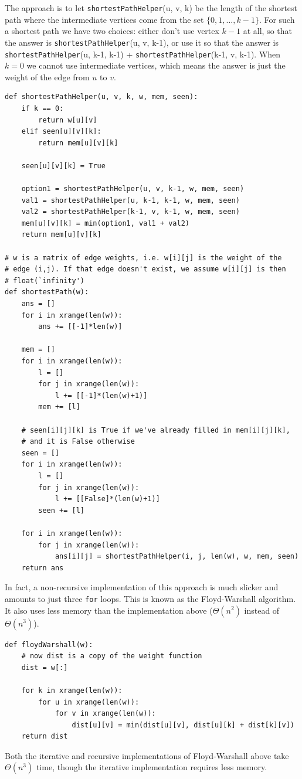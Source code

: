 \documentclass[11pt]{article}
\begin{document}
The
approach is to let \texttt{shortestPathHelper}(u, v, k) be the length of the
shortest path where the intermediate vertices come from the set
$\{0,1,\ldots,k-1\}$.  For such a shortest path we have two choices:
either don't use vertex $k-1$ at all, so that the answer is
\texttt{shortestPathHelper}(u, v, k-1), or use it so that the answer is
\texttt{shortestPathHelper}(u, k-1, k-1) + \texttt{shortestPathHelper}(k-1, v,
k-1).  When $k=0$ we cannot use intermediate vertices, which means the
answer is just the weight of the edge from $u$ to $v$.

\begin{verbatim}
def shortestPathHelper(u, v, k, w, mem, seen):
    if k == 0:
        return w[u][v]
    elif seen[u][v][k]:
        return mem[u][v][k]

    seen[u][v][k] = True
 
    option1 = shortestPathHelper(u, v, k-1, w, mem, seen)
    val1 = shortestPathHelper(u, k-1, k-1, w, mem, seen)
    val2 = shortestPathHelper(k-1, v, k-1, w, mem, seen)
    mem[u][v][k] = min(option1, val1 + val2)
    return mem[u][v][k]

# w is a matrix of edge weights, i.e. w[i][j] is the weight of the
# edge (i,j). If that edge doesn't exist, we assume w[i][j] is then
# float(`infinity')
def shortestPath(w):
    ans = []
    for i in xrange(len(w)):
        ans += [[-1]*len(w)]

    mem = []
    for i in xrange(len(w)):
        l = []
        for j in xrange(len(w)):
            l += [[-1]*(len(w)+1)]
        mem += [l]

    # seen[i][j][k] is True if we've already filled in mem[i][j][k],
    # and it is False otherwise
    seen = []
    for i in xrange(len(w)):
        l = []
        for j in xrange(len(w)):
            l += [[False]*(len(w)+1)]
        seen += [l]
    
    for i in xrange(len(w)):
        for j in xrange(len(w)):
            ans[i][j] = shortestPathHelper(i, j, len(w), w, mem, seen)
    return ans
\end{verbatim}

In fact, a non-recursive implementation of this approach is much
slicker and amounts to just three \texttt{for} loops.  This is known
as the Floyd-Warshall algorithm.  It also uses less memory than the
implementation above ($\Theta(n^2)$ instead of $\Theta(n^3)$).

\newpage

\begin{verbatim}
def floydWarshall(w):
    # now dist is a copy of the weight function
    dist = w[:]

    for k in xrange(len(w)):
        for u in xrange(len(w)):
            for v in xrange(len(w)):
                dist[u][v] = min(dist[u][v], dist[u][k] + dist[k][v])
    return dist  
\end{verbatim}

Both the iterative and recursive implementations of Floyd-Warshall
above take $\Theta(n^3)$ time, though the iterative implementation
requires less memory.
\end{document}
